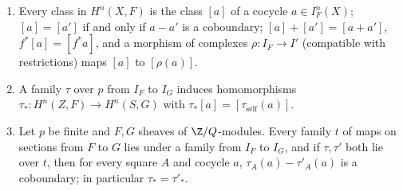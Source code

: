 \begin{lemma}[Families]\label{lem:pf:steps2:fam}
\begin{enumerate}[label=\textup{(\alph*)},nosep]
\item Every class in $H^n(X,F)$ is the class $[a]$ of a cocycle $a\in I_F^n(X)$; $[a]=[a']$ if and only
  if $a-a'$ is a coboundary; $[a]+[a']=[a+a']$, $f^\ast[a]=[f^\ast a]$, and a morphism of complexes
  $\rho\colon I_F\to I'$ \textup{(}compatible with restrictions\textup{)} maps $[a]$ to $[\rho(a)]$.
\item A family $\tau$ over $p$ from $I_F$ to $I_G$ induces homomorphisms $\tau_\ast\colon H^n(Z,F)\to
  H^n(S,G)$ with $\tau_\ast[a]=[\tau_{\mathrm{self}}(a)]$.
\item Let $p$ be finite and $F,G$ sheaves of $\Z/Q$-modules. Every family $t$ of maps on sections from
  $F$ to $G$ lies under a family from $I_F$ to $I_G$, and if $\tau,\tau'$ both lie over $t$, then for
  every square $A$ and cocycle $a$, $\tau_A(a)-\tau'_A(a)$ is a coboundary; in particular
  $\tau_\ast=\tau'_\ast$.
\end{enumerate}
\end{lemma}

